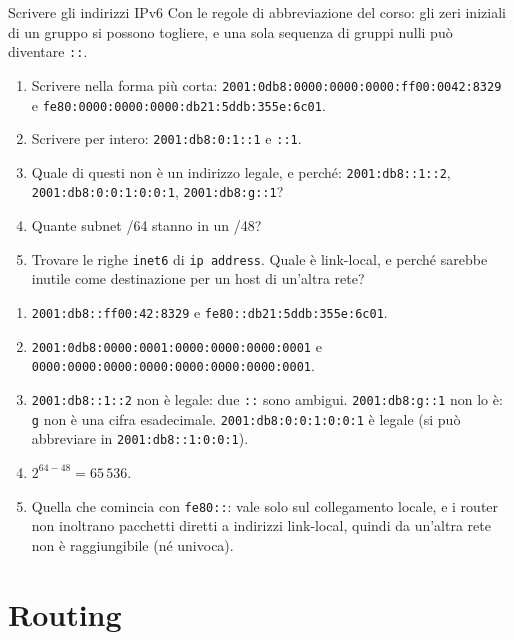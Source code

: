 \begin{esercizio}{Scrivere gli indirizzi IPv6}
\sloppy
Con le regole di abbreviazione del corso: gli zeri iniziali di un gruppo si possono togliere, e una sola sequenza di gruppi nulli può
diventare \texttt{::}.
\begin{enumerate}[label=(\alph*)]
    \item Scrivere nella forma più corta: \texttt{2001:0db8:0000:0000:0000:ff00:0042:8329} e \texttt{fe80:0000:0000:0000:db21:5ddb:355e:6c01}.
    \item Scrivere per intero: \texttt{2001:db8:0:1::1} e \texttt{::1}.
    \item Quale di questi non è un indirizzo legale, e perché: \texttt{2001:db8::1::2}, \texttt{2001:db8:0:0:1:0:0:1},
          \texttt{2001:db8:g::1}?
    \item Quante subnet /64 stanno in un /48?
    \item Trovare le righe \texttt{inet6} di \texttt{ip address}. Quale è link-local, e perché sarebbe inutile come destinazione per un host
          di un'altra rete?
\end{enumerate}

\svolgimento
\begin{enumerate}[label=(\alph*)]
    \item \texttt{2001:db8::ff00:42:8329} e \texttt{fe80::db21:5ddb:355e:6c01}.
    \item \texttt{2001:0db8:0000:0001:0000:0000:0000:0001} e \texttt{0000:0000:0000:0000:0000:0000:0000:0001}.
    \item \texttt{2001:db8::1::2} non è legale: due \texttt{::} sono ambigui. \texttt{2001:db8:g::1} non lo è: \texttt{g} non è una cifra
          esadecimale. \texttt{2001:db8:0:0:1:0:0:1} è legale (si può abbreviare in \texttt{2001:db8::1:0:0:1}).
    \item $2^{64-48} = 65\,536$.
    \item Quella che comincia con \texttt{fe80::}: vale solo sul collegamento locale, e i router non inoltrano pacchetti diretti a
          indirizzi link-local, quindi da un'altra rete non è raggiungibile (né univoca).
\end{enumerate}
\end{esercizio}

\section{Routing}

